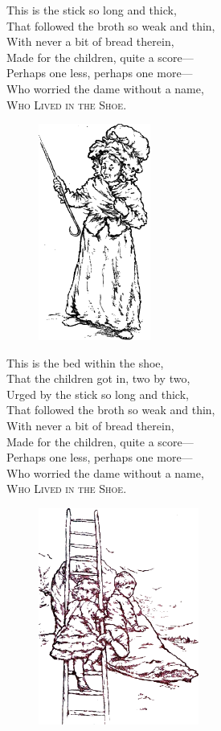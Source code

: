 \documentclass[oneside,12pt,english]{book}
\begin{document}
\pagebreak
This is the stick so long and thick,\\
That followed the broth so weak and thin,\\
With never a bit of bread therein,\\
Made for the children, quite a score---\\
Perhaps one less, perhaps one more---\\
Who worried the dame without a name,\\
\textsc{Who Lived in the Shoe}.
\bigskip
\bigskip

\begin{figure}[H]
\centering
\includegraphics[height=2.8in]{fig-05}
\end{figure}

\pagebreak
This is the bed within the shoe,\\
That the children got in, two by two,\\
Urged by the stick so long and thick,\\
That followed the broth so weak and thin,\\
With never a bit of bread therein,\\
Made for the children, quite a score---\\
Perhaps one less, perhaps one more---\\
Who worried the dame without a name,\\
\textsc{Who Lived in the Shoe}.
\bigskip
\bigskip

\begin{figure}[H]
\centering
\includegraphics[height=2.8in]{fig-06}
\end{figure}
\end{document}
